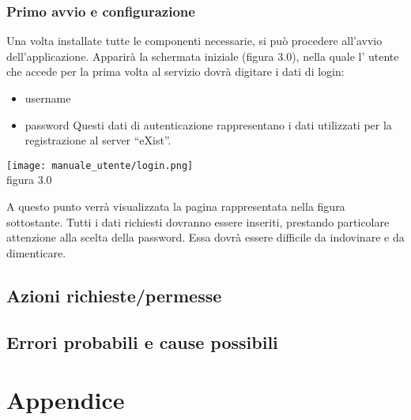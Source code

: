 \subsection{Primo avvio e configurazione}
Una volta installate tutte le componenti necessarie, si pu\`o procedere all'avvio dell'applicazione. Apparir\`a la schermata iniziale (figura 3.0), nella quale l' utente che accede per la prima volta al servizio dovr\`a digitare i dati di login:\\ 
\begin{itemize}
\item username
\item password
Questi dati di autenticazione rappresentano i dati utilizzati per la registrazione al server ``eXist''.
\end{itemize}
\begin{center}
 \texttt{[image: manuale\_utente/login.png]}
 \\figura 3.0
\end{center}
A questo punto verr\`a visualizzata la pagina rappresentata nella figura sottostante.
Tutti i dati richiesti dovranno essere inseriti, prestando particolare attenzione alla scelta della password. Essa dovr\`a essere difficile da indovinare e da dimenticare.
\section{Azioni richieste/permesse}
\section{Errori probabili e cause possibili}
\chapter{Appendice}
